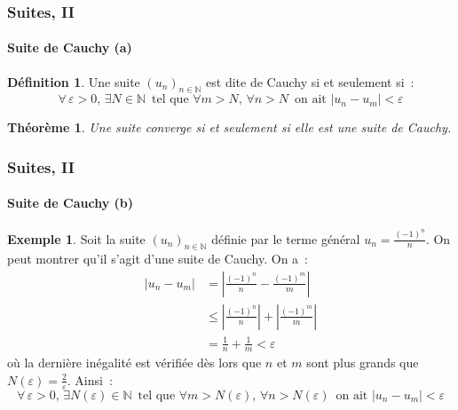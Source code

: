 \documentclass[10pt,notheorems]{beamer}
\theoremstyle{plain}
\newtheorem{theorem}{Théorème}
\theoremstyle{definition} %
\newtheorem{definition}{Définition}
\newtheorem{example}{Exemple}
\begin{document}
\begin{frame}
  \frametitle{Suites, II}
  \framesubtitle{Suite de Cauchy (a)}
  \hypertarget{slide_suite_cauchy_1}{}

  \bigskip

  \begin{definition}
    Une suite $(u_n)_{n\in\mathbb N}$ est dite de Cauchy si et seulement si~:
    \[
      \forall\,\varepsilon>0,\, \exists N\in\mathbb N\,\text{ tel que } \forall m>N,\, \forall n>N\, \text{ on ait }|u_n-u_m|<\varepsilon
    \]
  \end{definition}

  \bigskip

  \begin{theorem}
    Une suite converge si et seulement si elle est une suite de Cauchy.
  \end{theorem}

\end{frame}


\begin{frame}
  \frametitle{Suites, II}
  \framesubtitle{Suite de Cauchy (b)}
  \hypertarget{slide_suite_cauchy_1}{}

  \bigskip

  \begin{example}
    Soit la suite $(u_n)_{n\in\mathbb N}$ définie par le terme général $u_n = \frac{(-1)^n}{n}$. On peut montrer qu'il s'agit d'une suite de Cauchy. On a~:
    \[
      \begin{split}
        |u_n-u_m| &= \left|\frac{(-1)^n}{n}-\frac{(-1)^m}{m}\right|\\
        &\leq \left|\frac{(-1)^n}{n}\right|+\left|\frac{(-1)^m}{m}\right|\\
        &= \frac{1}{n} + \frac{1}{m} < \varepsilon
      \end{split}
    \]
    où la dernière inégalité est vérifiée dès lors que $n$ et $m$ sont plus grands que $N(\varepsilon)=\frac{2}{\varepsilon}$. Ainsi~:
    \[
      \forall\,\varepsilon>0,\, \exists N(\varepsilon)\in\mathbb N\,\text{ tel que } \forall m>N(\varepsilon),\, \forall n>N(\varepsilon)\, \text{ on ait }|u_n-u_m|<\varepsilon
    \]
  \end{example}

\end{frame}
\end{document}
